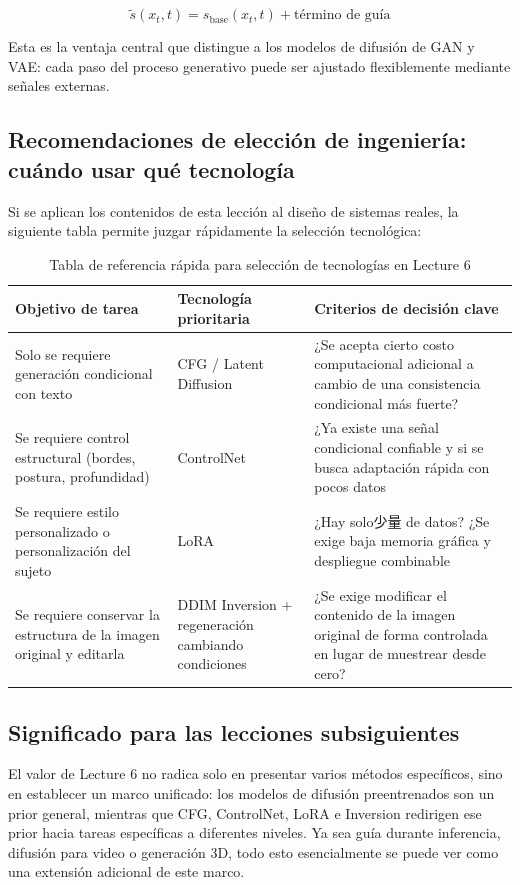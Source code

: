 $$
\tilde{s}(x_t, t) = s_{\text{base}}(x_t, t) + \text{término de guía}
$$

Esta es la ventaja central que distingue a los modelos de difusión de GAN y VAE: cada paso del proceso generativo puede ser ajustado flexiblemente mediante señales externas.

\subsection{Recomendaciones de elección de ingeniería: cuándo usar qué tecnología}

Si se aplican los contenidos de esta lección al diseño de sistemas reales, la siguiente tabla permite juzgar rápidamente la selección tecnológica:

\begin{table}[H]
\centering
\begin{tabular}{p{} p{} p{}}
\toprule
Objetivo de tarea & Tecnología prioritaria & Criterios de decisión clave \\
\midrule
Solo se requiere generación condicional con texto & CFG / Latent Diffusion & ¿Se acepta cierto costo computacional adicional a cambio de una consistencia condicional más fuerte? \\
Se requiere control estructural (bordes, postura, profundidad) & ControlNet & ¿Ya existe una señal condicional confiable y si se busca adaptación rápida con pocos datos \\
Se requiere estilo personalizado o personalización del sujeto & LoRA & ¿Hay solo少量 de datos? ¿Se exige baja memoria gráfica y despliegue combinable \\
Se requiere conservar la estructura de la imagen original y editarla & DDIM Inversion + regeneración cambiando condiciones & ¿Se exige modificar el contenido de la imagen original de forma controlada en lugar de muestrear desde cero? \\
\bottomrule
\end{tabular}
\caption{Tabla de referencia rápida para selección de tecnologías en Lecture 6}
\end{table}

\subsection{Significado para las lecciones subsiguientes}

El valor de Lecture 6 no radica solo en presentar varios métodos específicos, sino en establecer un marco unificado: los modelos de difusión preentrenados son un prior general, mientras que CFG, ControlNet, LoRA e Inversion redirigen ese prior hacia tareas específicas a diferentes niveles. Ya sea guía durante inferencia, difusión para video o generación 3D, todo esto esencialmente se puede ver como una extensión adicional de este marco.


